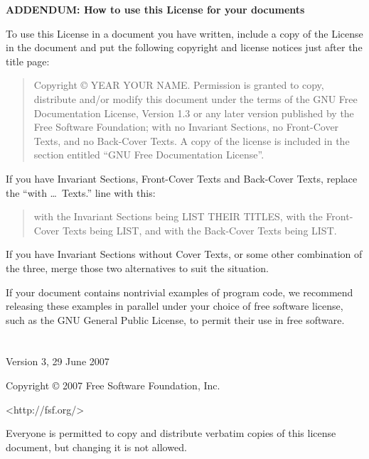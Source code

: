 \documentclass[twocolumn,twoside,fleqn,12pt]{article}
\begin{document}
\begin{center}
{\normalsize\bf ADDENDUM: How to use this License for your documents\par}
\end{center}

To use this License in a document you have written, include a copy of
the License in the document and put the following copyright and
license notices just after the title page:

\bigskip
\begin{quote}
    Copyright \copyright{}  YEAR  YOUR NAME.
    Permission is granted to copy, distribute and/or modify this document
    under the terms of the GNU Free Documentation License, Version 1.3
    or any later version published by the Free Software Foundation;
    with no Invariant Sections, no Front-Cover Texts, and no Back-Cover Texts.
    A copy of the license is included in the section entitled ``GNU
    Free Documentation License''.
\end{quote}
\bigskip

If you have Invariant Sections, Front-Cover Texts and Back-Cover Texts,
replace the ``with \dots\ Texts.'' line with this:

\bigskip
\begin{quote}
    with the Invariant Sections being LIST THEIR TITLES, with the
    Front-Cover Texts being LIST, and with the Back-Cover Texts being LIST.
\end{quote}
\bigskip

If you have Invariant Sections without Cover Texts, or some other
combination of the three, merge those two alternatives to suit the
situation.

If your document contains nontrivial examples of program code, we
recommend releasing these examples in parallel under your choice of
free software license, such as the GNU General Public License,
to permit their use in free software.

\newpage
\section{}
\label{GnuSoftwareLicense}

\begin{center}

                       Version 3, 29 June 2007


\medskip
Copyright \copyright{} 2007 Free Software Foundation, Inc.

\medskip
<http://fsf.org/>

\medskip
Everyone is permitted to copy and distribute verbatim copies
of this license document, but changing it is not allowed.
\end{center}
\end{document}
